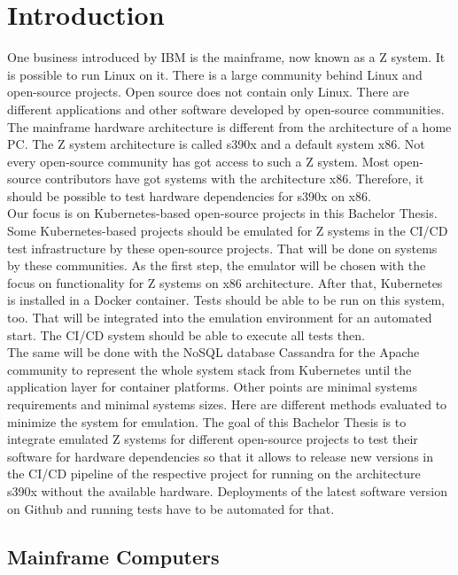 \chapter{Introduction}\label{ch:intro}

One business introduced by IBM is the mainframe, now known as a Z system. It is possible to run Linux on it. There is a large community behind Linux and open-source projects. Open source does not contain only \gls{Linux}. There are different applications and other software developed by open-source communities. The mainframe hardware architecture is different from the architecture of a home PC. The Z system architecture is called \gls{s390x} and a default system \gls{x86}. Not every open-source community has got access to such a Z system. Most open-source contributors have got systems with the architecture x86. Therefore, it should be possible to test hardware dependencies for s390x on x86. \\
Our focus is on Kubernetes-based open-source projects in this Bachelor Thesis. Some Kubernetes-based projects should be emulated for Z systems in the \gls{CI/CD} test infrastructure by these open-source projects. That will be done on systems by these communities. As the first step, the emulator will be chosen with the focus on functionality for Z systems on x86 architecture. After that, Kubernetes is installed in a Docker container. Tests should be able to be run on this system, too. That will be integrated into the emulation environment for an automated start. The CI/CD system should be able to execute all tests then. \\
The same will be done with the NoSQL database Cassandra for the Apache community to represent the whole system stack from Kubernetes until the \gls{application layer} for container platforms. Other points are minimal systems requirements and minimal systems sizes. Here are different methods evaluated to minimize the system for emulation.
The goal of this Bachelor Thesis is to integrate emulated Z systems for different open-source projects to test their software for hardware dependencies so that it allows to release new versions in the CI/CD pipeline of the respective project for running on the architecture s390x without the available hardware. Deployments of the latest software version on Github and running tests have to be automated for that.



\section{Mainframe Computers}

